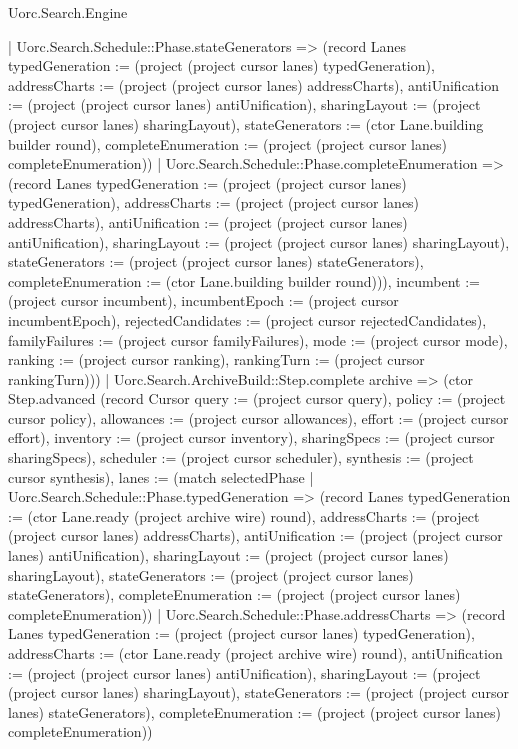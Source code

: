 \begin{lexlean}{Uorc.Search.Engine}
\begin{semanticmodule}
{{      | Uorc.Search.Schedule::Phase.stateGenerators => (record Lanes {typedGeneration := (project (project cursor lanes) typedGeneration), addressCharts := (project (project cursor lanes) addressCharts), antiUnification := (project (project cursor lanes) antiUnification), sharingLayout := (project (project cursor lanes) sharingLayout), stateGenerators := (ctor Lane.building builder round), completeEnumeration := (project (project cursor lanes) completeEnumeration)})
      | Uorc.Search.Schedule::Phase.completeEnumeration => (record Lanes {typedGeneration := (project (project cursor lanes) typedGeneration), addressCharts := (project (project cursor lanes) addressCharts), antiUnification := (project (project cursor lanes) antiUnification), sharingLayout := (project (project cursor lanes) sharingLayout), stateGenerators := (project (project cursor lanes) stateGenerators), completeEnumeration := (ctor Lane.building builder round)})), incumbent := (project cursor incumbent), incumbentEpoch := (project cursor incumbentEpoch), rejectedCandidates := (project cursor rejectedCandidates), familyFailures := (project cursor familyFailures), mode := (project cursor mode), ranking := (project cursor ranking), rankingTurn := (project cursor rankingTurn)}))
    | Uorc.Search.ArchiveBuild::Step.complete archive => (ctor Step.advanced (record Cursor {query := (project cursor query), policy := (project cursor policy), allowances := (project cursor allowances), effort := (project cursor effort), inventory := (project cursor inventory), sharingSpecs := (project cursor sharingSpecs), scheduler := (project cursor scheduler), synthesis := (project cursor synthesis), lanes := (match selectedPhase
      | Uorc.Search.Schedule::Phase.typedGeneration => (record Lanes {typedGeneration := (ctor Lane.ready (project archive wire) round), addressCharts := (project (project cursor lanes) addressCharts), antiUnification := (project (project cursor lanes) antiUnification), sharingLayout := (project (project cursor lanes) sharingLayout), stateGenerators := (project (project cursor lanes) stateGenerators), completeEnumeration := (project (project cursor lanes) completeEnumeration)})
      | Uorc.Search.Schedule::Phase.addressCharts => (record Lanes {typedGeneration := (project (project cursor lanes) typedGeneration), addressCharts := (ctor Lane.ready (project archive wire) round), antiUnification := (project (project cursor lanes) antiUnification), sharingLayout := (project (project cursor lanes) sharingLayout), stateGenerators := (project (project cursor lanes) stateGenerators), completeEnumeration := (project (project cursor lanes) completeEnumeration)})
}}
\end{semanticmodule}
\end{lexlean}
